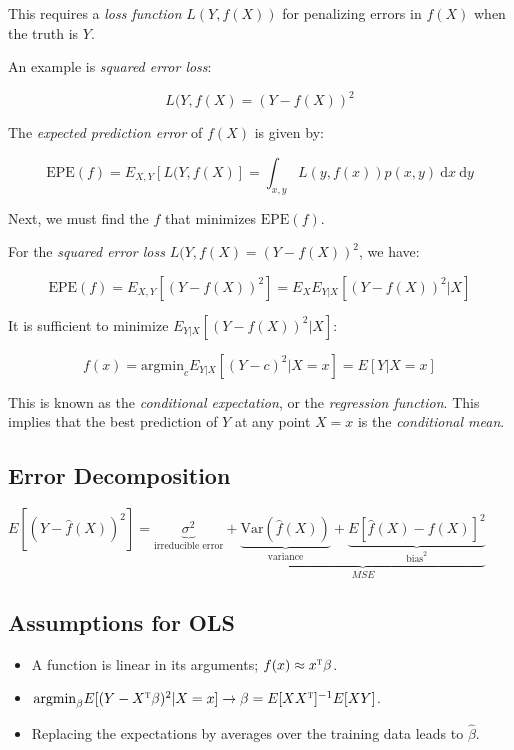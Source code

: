 \documentclass[twoside,twocolumn,10pt]{revtex4-1}
\begin{document}
	This requires a \textit{loss function} $L(Y,f(X))$ for penalizing errors in $f(X)$ when the truth is $Y$.
	
	An example is \textit{squared error loss}:
	
	\begin{equation*}
	L(Y,f(X) = (Y - f(X))^2
	\end{equation*}	 
	
	The \textit{expected prediction error} of $f(X)$ is given by:
	
	\begin{equation*}
	\text{EPE}(f) = E_{X,Y} [L(Y,f(X)] = \int_{x,y} L(y,f(x)) p(x,y) \ \text{d}x \ \text{d}y
	\end{equation*}
	
	Next, we must find the $f$ that minimizes $\text{EPE}(f)$.
	
	For the \textit{squared error loss} $L(Y,f(X) = (Y - f(X))^2$, we have:
	
	\begin{equation*}
	\text{EPE}(f) = E_{X,Y} [(Y - f(X))^2] = E_X E_{Y|X} [(Y - f(X))^2 | X] 
	\end{equation*}
	
	It is sufficient to minimize $E_{Y|X} [(Y - f(X))^2 | X]$:
	
	\begin{equation*}
	f(x) = \text{argmin}_c E_{Y|X} [(Y - c)^2 | X = x] = E[Y|X=x]
	\end{equation*}
	
	This is known as the \textit{conditional expectation}, or the \textit{regression function}.  This implies that the best prediction of $Y$ at any point $X = x$ is the \textit{conditional mean}.
	
	\subsection{Error Decomposition}
	
	$E[(Y - \hat{f}(X))^2] = \underbrace{\sigma^2}_{\text{irreducible error}} + \underbrace{\underbrace{\text{Var}(\hat{f}(X))}_{\text{variance}} + \underbrace{E[\hat{f}(X) - f(X)]^2}_{\text{bias}^2}}_{MSE}$
	
	
	\subsection{Assumptions for OLS}
	
	\begin{itemize}
	\item A function is linear in its arguments; $f(x) \approx x^\textsc{t} \beta$.
	\item $\text{argmin}_\beta E [(Y - X^\textsc{t}\beta)^2 | X = x] \to \beta = E[XX^\textsc{t}]^{-1} E[XY]$.
	\item Replacing the expectations by averages over the training data leads to $\hat{\beta}$.
	\end{itemize}
	
\end{document}
